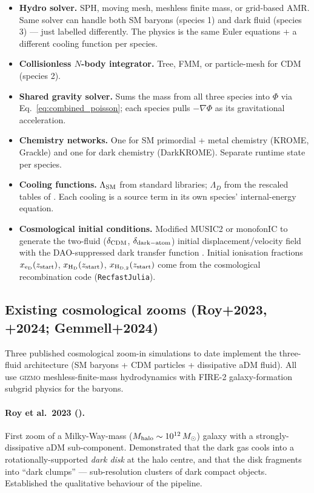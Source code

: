 \documentclass[12pt]{article}
\newcommand{\HD}{\mathrm{H_D}}
\newcommand{\HDtwo}{\mathrm{H_{D,2}}}
\newcommand{\eD}{\mathrm{e_D}}
\newcommand{\Msun}{\,M_\odot}
\begin{document}
\begin{itemize}
  \item \textbf{Hydro solver.}  SPH, moving mesh, meshless finite mass,
        or grid-based AMR.  Same solver can handle both SM baryons
        (species 1) and dark fluid (species 3) — just labelled
        differently.  The physics is the same Euler equations + a
        different cooling function per species.
  \item \textbf{Collisionless $N$-body integrator.}  Tree, FMM, or
        particle-mesh for CDM (species 2).
  \item \textbf{Shared gravity solver.}  Sums the mass from all three
        species into $\Phi$ via
        Eq.~\eqref{eq:combined_poisson}; each species pulls $-\nabla\Phi$
        as its gravitational acceleration.
  \item \textbf{Chemistry networks.}  One for SM primordial + metal
        chemistry (KROME, Grackle) and one for dark chemistry
        (DarkKROME).  Separate runtime state per species.
  \item \textbf{Cooling functions.}  $\Lambda_{\rm SM}$ from standard
        libraries; $\Lambda_D$ from the rescaled tables of
        \citet{Ryan2022a}.  Each cooling is a source term in its own
        species' internal-energy equation.
  \item \textbf{Cosmological initial conditions.}  Modified MUSIC2 or
        monofonIC to generate the two-fluid ($\delta_{\rm CDM}$,
        $\delta_{\rm dark-atom}$) initial displacement/velocity field
        with the DAO-suppressed dark transfer function
        \citep{Gurian2022}.  Initial ionisation fractions
        $x_{\eD}(z_{\rm start})$, $x_{\HD}(z_{\rm start})$,
        $x_{\HDtwo}(z_{\rm start})$ come from the cosmological
        recombination code (\texttt{RecfastJulia}).
\end{itemize}

\subsection{Existing cosmological zooms (Roy+2023, +2024; Gemmell+2024)}
\label{sec:roy2024}

Three published cosmological zoom-in simulations to date implement
the three-fluid architecture (SM baryons + CDM particles + dissipative
aDM fluid).  All use \textsc{gizmo} meshless-finite-mass hydrodynamics
with FIRE-2 galaxy-formation subgrid physics for the baryons.

\paragraph{Roy et al.\ 2023 (\citealt{Roy2023}).} First zoom of a
Milky-Way-mass ($M_{\rm halo}\sim 10^{12}\Msun$) galaxy with a
strongly-dissipative aDM sub-component.  Demonstrated that the dark
gas cools into a rotationally-supported \emph{dark disk} at the halo
centre, and that the disk fragments into ``dark clumps'' ---
sub-resolution clusters of dark compact objects.  Established the
qualitative behaviour of the pipeline.
\end{document}
